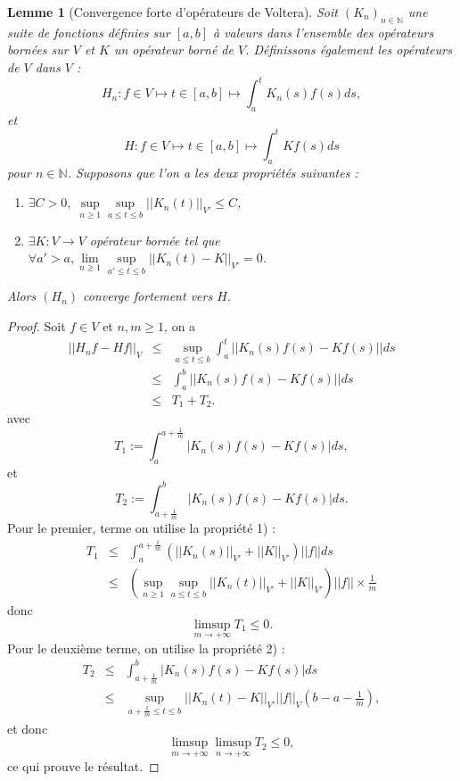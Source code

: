 \documentclass[12pt,openany,a4paper, titlepage]{article}
\newcommand{\f}[2]{\frac{#1}{#2}}
\newcommand{\lp}{\left(}
\newcommand{\rp}{\right)}
\newcommand{\lb}{\left|}
\newcommand{\rb}{\right|}
\newcommand{\N}{\mathbb{N}}
\newtheorem{lem}{Lemme}
\theoremstyle{definition}
\theoremstyle{definition}
\theoremstyle{definition}
\theoremstyle{definition}
\theoremstyle{definition}
\theoremstyle{definition}
\begin{document}
\begin{lem} [Convergence forte d'opérateurs de Voltera]
Soit $(K_n)_{n\in\N}$ une suite de fonctions définies sur $[a,b]$ à valeurs dans l'ensemble des opérateurs bornées sur $V$ et $K$ un opérateur borné de $V$.
Définissons également les opérateurs de $V$ dans $V$ :
$$H_n :f\in V \mapsto t\in[a,b] \mapsto \int_a^t K_n(s)f(s)ds,$$ 
et
$$H :f\in V \mapsto t\in[a,b] \mapsto \int_a^t Kf(s)ds$$ 
pour $n\in\N$.
Supposons que l'on a les deux propriétés suivantes :
\begin{enumerate}
    \item $\exists C > 0, \; \sup\limits_{n\geq 1}\sup\limits_{a\leq t \leq b } ||K_n(t)||_{V'} \leq C$,
    \item $\exists K:V\rightarrow V$ opérateur bornée tel que $\forall a'>a, \lim\limits_{n\geq 1}\sup\limits_{a'\leq t \leq b } ||K_n(t) - K||_{V'} = 0 $. 
\end{enumerate}
Alors $(H_n)$ converge fortement vers $H$.
\end{lem}
\begin{proof}
Soit $f\in V$ et $n, m\geq 1$, on a 
\begin{eqnarray}
\lb\lb H_nf - Hf \rb\rb_V &\leq& \sup\limits_{a\leq t\leq b} \int_a^t ||K_n(s)f(s) - Kf(s)||ds \\
                          &\leq& \int_a^b ||K_n(s)f(s) - Kf(s)||ds \\
                          &\leq& T_1 + T_2.
\end{eqnarray}
avec
\begin{equation}
T_1 :=  \int_a^{a+\f{1}{m}} |K_n(s)f(s) - Kf(s)|ds,
\end{equation}
et 
\begin{equation}
T_2 :=  \int_{a+\f{1}{m}}^b |K_n(s)f(s) - Kf(s)|ds.
\end{equation}
Pour le premier, terme on utilise la propriété 1) : 
\begin{eqnarray}
T_1 &\leq& \int_a^{a+\f{1}{m}} \lp ||K_n(s)||_{V'} + ||K||_{V'}\rp ||f|| ds \\
    &\leq& \lp \sup\limits_{n\geq 1}\sup\limits_{a\leq t \leq b } ||K_n(t)||_{V'} + ||K||_{V'}\rp ||f|| \times \f{1}{m}
\end{eqnarray}
donc 
\begin{equation}
\limsup\limits_{m\rightarrow +\infty} T_1 \leq  0.
\end{equation}
Pour le deuxième terme, on utilise la propriété 2) :
\begin{eqnarray}
T_2 &\leq& \int_{a+\f{1}{m}}^b |K_n(s)f(s) - Kf(s)|ds \\
    &\leq& \sup\limits_{a+\f{1}{m} \leq t \leq b} ||K_n(t) - K||_{V'} ||f||_V \lp b - a - \f{1}{m} \rp,
\end{eqnarray}
et donc
\begin{equation}
\limsup\limits_{m\rightarrow +\infty}\limsup\limits_{n\rightarrow +\infty} T_2 \leq  0,
\end{equation}
ce qui prouve le résultat.
\end{proof}
\end{document}
